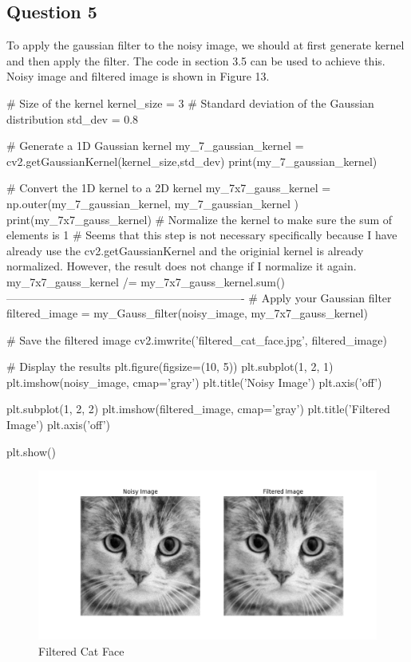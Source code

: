 \documentclass[12pt]{article}
\begin{document}
\subsection{Question 5}
\quad To apply the gaussian filter to the noisy image, we should at first generate kernel and then apply the filter. The code in section 3.5 can be used to achieve this. Noisy image and filtered image is shown in Figure 13.
\begin{python}
# Size of the kernel
kernel_size = 3
# Standard deviation of the Gaussian distribution
std_dev = 0.8

# Generate a 1D Gaussian kernel
my_7_gaussian_kernel = cv2.getGaussianKernel(kernel_size,std_dev)
print(my_7_gaussian_kernel)

# Convert the 1D kernel to a 2D kernel
my_7x7_gauss_kernel = np.outer(my_7_gaussian_kernel, my_7_gaussian_kernel )
print(my_7x7_gauss_kernel)
# Normalize the kernel to make sure the sum of elements is 1
# Seems that this step is not necessary specifically because I have already use the cv2.getGaussianKernel and the originial kernel is already normalized. However, the result does not change if I normalize it again.
my_7x7_gauss_kernel /= my_7x7_gauss_kernel.sum()
----------------------------------------------------------------
# Apply your Gaussian filter
filtered_image = my_Gauss_filter(noisy_image, my_7x7_gauss_kernel)

# Save the filtered image
cv2.imwrite('filtered_cat_face.jpg', filtered_image)

# Display the results
plt.figure(figsize=(10, 5))
plt.subplot(1, 2, 1)
plt.imshow(noisy_image, cmap='gray')
plt.title('Noisy Image')
plt.axis('off')

plt.subplot(1, 2, 2)
plt.imshow(filtered_image, cmap='gray')
plt.title('Filtered Image')
plt.axis('off')

plt.show()
\end{python}

\begin{figure}[H]
  \centering
  \includegraphics[width=1.0\textwidth]{noisy_and_filtered_cat_face.png}
  \caption{Filtered Cat Face}
  \label{fig:example}
\end{figure}
\end{document}
